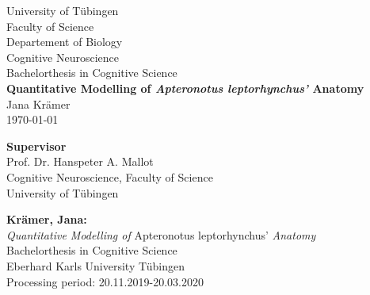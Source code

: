 \documentclass[twoside,12pt,a4paper]{report}
\begin{document}
 
\begin{titlepage}
 \begin{center}
  {\LARGE University of T\"ubingen}\\
  {\large Faculty of Science \\
Departement of Biology\\
Cognitive Neuroscience \\[4cm]}
  {\huge Bachelorthesis in Cognitive Science\\[2cm]}
  {\Large\bf  Quantitative Modelling of \textit{Apteronotus leptorhynchus'} Anatomy \\[1.5cm]}
 {\large Jana Kr\"amer}\\[0.5cm]
\today\\[3cm]
\begin{center}{\small\bf Supervisor}\\[0.5cm]
{\large Prof. Dr. Hanspeter A. Mallot}\\
  {\footnotesize Cognitive Neuroscience, Faculty of Science\\
	University of T\"ubingen}	\end{center}
	
	
  \end{center}
\end{titlepage}


\thispagestyle{empty}
\vspace*{\fill}
\begin{minipage}{13.2cm}
\textbf{Krämer, Jana:}\\
\emph{Quantitative Modelling of} Apteronotus leptorhynchus' \emph{Anatomy}\\ 
Bachelorthesis in Cognitive Science\\
Eberhard Karls University T\"ubingen\\
Processing period: 20.11.2019-20.03.2020
\end{minipage}
\newpage


\setcounter{page}{1}
\end{document}
